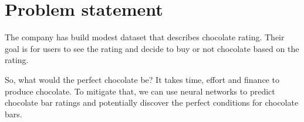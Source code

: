 \section{Problem statement}
The company \parencite{web:FlavorsOfCacao} has build modest dataset that describes chocolate rating. Their goal is for users to see the rating and decide to buy or not chocolate based on the rating.

So, what would the perfect chocolate be? It takes time, effort and finance to produce chocolate. To mitigate that, we can use neural networks to predict chocolate bar ratings and potentially discover the perfect conditions for chocolate bars.